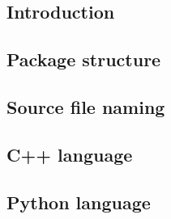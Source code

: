 \setcounter{Rulecounter}{1}

\newcommand{\Rule}[2]{
\begin{description}
\item[{\color{blue} R\arabic{Rulecounter}}] \label{rule:#1}#2
\end{description}
\refstepcounter{Rulecounter}
}
%
\newcommand{\RuleX}[2]{
\begin{description}
\item[{\color{blue} R#1}] #2
\end{description}
}


\label{coding_rules}


\subsection{Introduction}

\cleardoublepage

\subsection{Package structure}

\cleardoublepage

\subsection{Source file naming}

\cleardoublepage

\subsection{C++ language}

\cleardoublepage

\subsection{Python language}

\cleardoublepage
